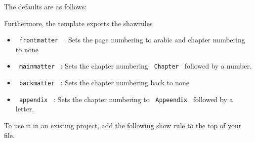 The defaults are as follows:

\begin{Shaded}
\begin{Highlighting}[]
\NormalTok{  ),}
\NormalTok{  ),}
\NormalTok{  ),}
\NormalTok{)}
\end{Highlighting}
\end{Shaded}

Furthermore, the template exports the shawrules

\begin{itemize}
\tightlist
\item
  \texttt{\ frontmatter\ } : Sets the page numbering to arabic and
  chapter numbering to none
\item
  \texttt{\ mainmatter\ } : Sets the chapter numbering
  \texttt{\ Chapter\ } followed by a number.
\item
  \texttt{\ backmatter\ } : Sets the chapter numbering back to none
\item
  \texttt{\ appendix\ } : Sets the chapter numbering to
  \texttt{\ Appeendix\ } followed by a letter.
\end{itemize}

To use it in an existing project, add the following show rule to the top
of your file.

